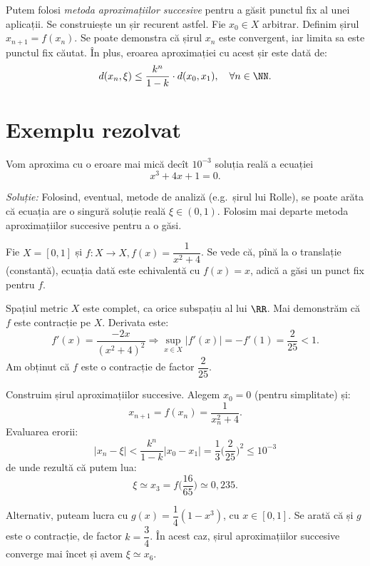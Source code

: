 Putem folosi \emph{metoda aproximațiilor succesive} pentru a găsit punctul
fix al unei aplicații. Se construiește un șir recurent astfel. Fie $ x_0 \in X $
arbitrar. Definim șirul $ x_{n + 1} = f(x_n) $. Se poate demonstra că șirul
$ x_n $ este convergent, iar limita sa este punctul fix căutat. În plus,
eroarea aproximației cu acest șir este dată de:
\[
  d(x_n, \xi) \leq \dfrac{k^n}{1 - k} \cdot d(x_0, x_1), \quad \forall n \in \NN.
\]


\section{Exemplu rezolvat}

Vom aproxima cu o eroare mai mică decît $ 10^{-3} $ soluția reală a
ecuației
\[
  x^3 + 4x + 1 = 0.
\]

\emph{Soluție:} Folosind, eventual, metode de analiză (e.g.\ șirul lui Rolle),
se poate arăta că ecuația are o singură soluție reală $ \xi \in (0, 1) $. Folosim
mai departe metoda aproximațiilor succesive pentru a o găsi.

Fie $ X = [0, 1] $ și $ f : X \to X, f(x) = \dfrac{1}{x^2 + 4} $. Se vede că,
pînă la o translație (constantă), ecuația dată este echivalentă cu $ f(x) = x $,
adică a găsi un punct fix pentru $ f $.

Spațiul metric $ X $ este complet, ca orice subspațiu al lui $ \RR $. Mai
demonstrăm că $ f $ este contracție pe $ X $. Derivata este:
\[
  f'(x) = \frac{-2x}{(x^2 + 4)^2} \Rightarrow %
  \sup_{x \in X}|f'(x)| = -f'(1) = \frac{2}{25} < 1.
\]
Am obținut că $ f $ este o contracție de factor $ \dfrac{2}{25}. $

Construim șirul aproximațiilor succesive. Alegem $ x_0 = 0 $ (pentru simplitate)
și:
\[
  x_{n + 1} = f(x_n) = \dfrac{1}{x_n^2 + 4}.
\]
Evaluarea erorii:
\[
  |x_n - \xi| < \frac{k^n}{1 - k} | x_0 - x_1 | = %
  \frac{1}{3} \Big( \frac{2}{25} \Big)^2 \leq 10^{-3}
\]
de unde rezultă că putem lua:
\[
  \xi \simeq x_3 = f \Big(\frac{16}{65} \Big) \simeq 0,235.
\]

\begin{remark}\label{rk:alt}
  Alternativ, puteam lucra cu $ g(x) = \dfrac{1}{4} (1 - x^3) $, cu $ x\in [0, 1] $.
  Se arată că și $ g $ este o contracție, de factor $ k = \dfrac{3}{4} $. În acest
  caz, șirul aproximațiilor succesive converge mai încet și avem $ \xi \simeq x_6 $.
\end{remark}

